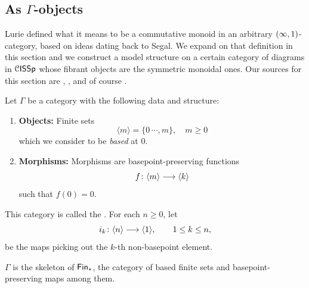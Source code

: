 \subsection{As \texorpdfstring{$\Gamma$}{Gamma}-objects}

Lurie defined what it means to be a commutative monoid in an arbitrary $(\operatorname{\infty},1)$-category, based on ideas dating back to Segal. We expand on that definition in this section and we construct a model structure on a certain category of diagrams in $\mathcal C\mathsf{ISSp}$ whose fibrant objects are the symmetric monoidal ones. Our sources for this section are \cite{CS19}, \cite[Appendix~A]{JFS15}, and of course \cite{LurieHA}.

\begin{definition}
    Let $\Gamma$ be a category with the following data and structure:
    \begin{enumerate}
        \item \textbf{Objects:} Finite sets 
        \begin{equation}
            \langle m \rangle = \{0\,\cdots, m\}, \quad m\geq 0
        \end{equation}
        which we consider to be \emph{based} at 0. 
        \item \textbf{Morphisms:} Morphisms are basepoint-preserving functions 
        \begin{equation}
            f\colon \langle m \rangle \longrightarrow \langle k \rangle 
        \end{equation} 
        such that $f(0) = 0$.
    \end{enumerate}
    This category is called the . For each $n\geq 0$, let
      \begin{equation}
        i_k \colon \langle n\rangle \longrightarrow \langle 1\rangle,
        \qquad 1\leq k\leq n,
      \end{equation}
      be the maps picking out the $k$-th non-basepoint element. 
\end{definition}

\begin{observation}
    $\Gamma$ is the skeleton of $\operatorname{\sf Fin}_*$, the category of based finite sets and basepoint-preserving maps among them.
\end{observation}

